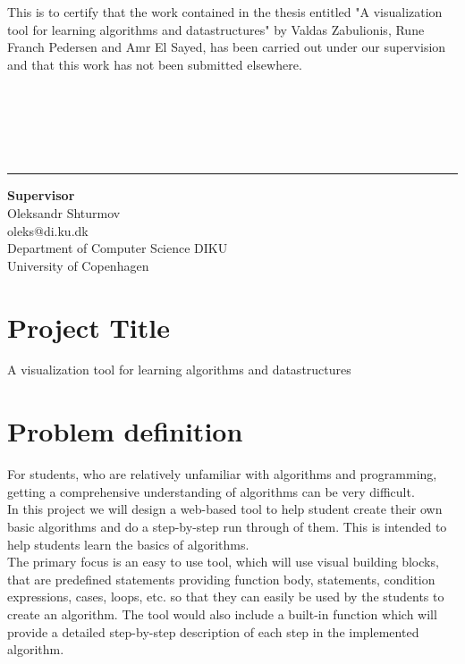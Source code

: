 \documentclass[11pt]{article}
\begin{document}
This is to certify that the work contained in the thesis entitled "A visualization tool for learning algorithms and datastructures" by Valdas Zabulionis, Rune Franch Pedersen and Amr El Sayed, has been carried out under our supervision and that this work has not been submitted elsewhere.\\\\\\\\\\\\
\begin{center}\noindent\rule{8cm}{0.4pt}%

\begin{center}
\textbf{Supervisor}\\
Oleksandr Shturmov \\
oleks@di.ku.dk \\
Department of Computer Science DIKU \\
University of Copenhagen
\end{center}
\newpage
\tableofcontents
\end{center}
\newpage
\section*{Project Title}
A visualization tool for learning algorithms and datastructures

\section*{Problem definition}

For students, who are relatively unfamiliar with algorithms and programming, getting a comprehensive understanding of algorithms can be very difficult.\\
In this project we will design a web-based tool to help student create their own basic algorithms and do a step-by-step run through of them.
This is intended to help students learn the basics of algorithms.\\
The primary focus is an easy to use tool, which will use visual building blocks, that are predefined statements providing function body, statements, condition expressions, cases, loops, etc. so that they can easily be used by the students to create an algorithm. The tool would also include a built-in function which will provide a detailed step-by-step description of each step in the implemented algorithm.
\end{document}
